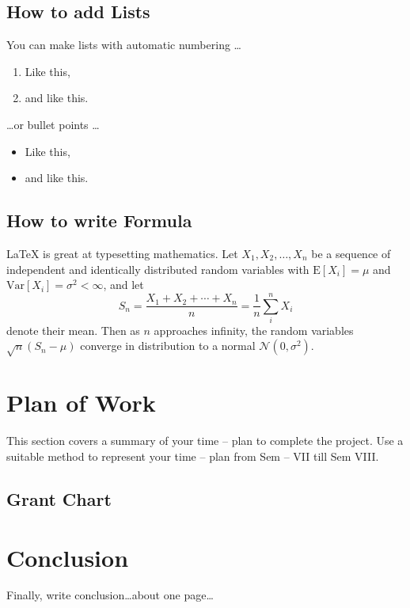 \documentclass[12pt, a4paper, oneside, openright]{Thesis} %
\begin{document}
\subsection{How to add Lists}

You can make lists with automatic numbering \dots

\begin{enumerate}
\item Like this,
\item and like this.
\end{enumerate}
\dots or bullet points \dots
\begin{itemize}
\item Like this,
\item and like this.
\end{itemize}

\subsection{How to write Formula}

\LaTeX{} is great at typesetting mathematics. Let $X_1, X_2, \ldots, X_n$ be a sequence of independent and identically distributed random variables with $\text{E}[X_i] = \mu$ and $\text{Var}[X_i] = \sigma^2 < \infty$, and let
\[S_n = \frac{X_1 + X_2 + \cdots + X_n}{n}
      = \frac{1}{n}\sum_{i}^{n} X_i\]
denote their mean. Then as $n$ approaches infinity, the random variables $\sqrt{n}(S_n - \mu)$ converge in distribution to a normal $\mathcal{N}(0, \sigma^2)$.


\section{Plan of Work}
This section covers a summary of your time – plan to complete the project. Use a suitable method to represent your time – plan from Sem – VII till Sem VIII.


\subsection{Grant Chart}
\section{Conclusion}
Finally, write conclusion…about one page…
%
% 
%
% 
% 
%  
\end{document}
